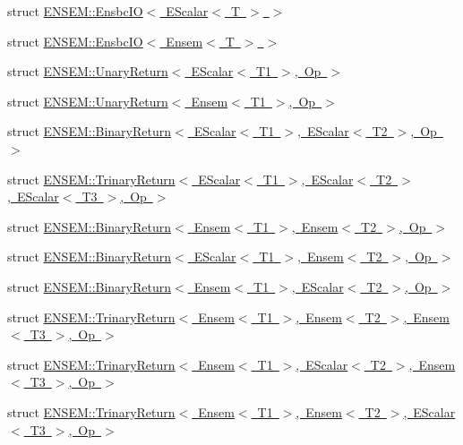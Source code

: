 \begin{DoxyCompactItemize}
struct \mbox{\hyperlink{structENSEM_1_1EnsbcIO_3_01EScalar_3_01T_01_4_01_4}{E\+N\+S\+E\+M\+::\+Ensbc\+I\+O$<$ E\+Scalar$<$ T $>$ $>$}}
\item 
struct \mbox{\hyperlink{structENSEM_1_1EnsbcIO_3_01Ensem_3_01T_01_4_01_4}{E\+N\+S\+E\+M\+::\+Ensbc\+I\+O$<$ Ensem$<$ T $>$ $>$}}
\item 
struct \mbox{\hyperlink{structENSEM_1_1UnaryReturn_3_01EScalar_3_01T1_01_4_00_01Op_01_4}{E\+N\+S\+E\+M\+::\+Unary\+Return$<$ E\+Scalar$<$ T1 $>$, Op $>$}}
\item 
struct \mbox{\hyperlink{structENSEM_1_1UnaryReturn_3_01Ensem_3_01T1_01_4_00_01Op_01_4}{E\+N\+S\+E\+M\+::\+Unary\+Return$<$ Ensem$<$ T1 $>$, Op $>$}}
\item 
struct \mbox{\hyperlink{structENSEM_1_1BinaryReturn_3_01EScalar_3_01T1_01_4_00_01EScalar_3_01T2_01_4_00_01Op_01_4}{E\+N\+S\+E\+M\+::\+Binary\+Return$<$ E\+Scalar$<$ T1 $>$, E\+Scalar$<$ T2 $>$, Op $>$}}
\item 
struct \mbox{\hyperlink{structENSEM_1_1TrinaryReturn_3_01EScalar_3_01T1_01_4_00_01EScalar_3_01T2_01_4_00_01EScalar_3_01T3_01_4_00_01Op_01_4}{E\+N\+S\+E\+M\+::\+Trinary\+Return$<$ E\+Scalar$<$ T1 $>$, E\+Scalar$<$ T2 $>$, E\+Scalar$<$ T3 $>$, Op $>$}}
\item 
struct \mbox{\hyperlink{structENSEM_1_1BinaryReturn_3_01Ensem_3_01T1_01_4_00_01Ensem_3_01T2_01_4_00_01Op_01_4}{E\+N\+S\+E\+M\+::\+Binary\+Return$<$ Ensem$<$ T1 $>$, Ensem$<$ T2 $>$, Op $>$}}
\item 
struct \mbox{\hyperlink{structENSEM_1_1BinaryReturn_3_01EScalar_3_01T1_01_4_00_01Ensem_3_01T2_01_4_00_01Op_01_4}{E\+N\+S\+E\+M\+::\+Binary\+Return$<$ E\+Scalar$<$ T1 $>$, Ensem$<$ T2 $>$, Op $>$}}
\item 
struct \mbox{\hyperlink{structENSEM_1_1BinaryReturn_3_01Ensem_3_01T1_01_4_00_01EScalar_3_01T2_01_4_00_01Op_01_4}{E\+N\+S\+E\+M\+::\+Binary\+Return$<$ Ensem$<$ T1 $>$, E\+Scalar$<$ T2 $>$, Op $>$}}
\item 
struct \mbox{\hyperlink{structENSEM_1_1TrinaryReturn_3_01Ensem_3_01T1_01_4_00_01Ensem_3_01T2_01_4_00_01Ensem_3_01T3_01_4_00_01Op_01_4}{E\+N\+S\+E\+M\+::\+Trinary\+Return$<$ Ensem$<$ T1 $>$, Ensem$<$ T2 $>$, Ensem$<$ T3 $>$, Op $>$}}
\item 
struct \mbox{\hyperlink{structENSEM_1_1TrinaryReturn_3_01Ensem_3_01T1_01_4_00_01EScalar_3_01T2_01_4_00_01Ensem_3_01T3_01_4_00_01Op_01_4}{E\+N\+S\+E\+M\+::\+Trinary\+Return$<$ Ensem$<$ T1 $>$, E\+Scalar$<$ T2 $>$, Ensem$<$ T3 $>$, Op $>$}}
\item 
struct \mbox{\hyperlink{structENSEM_1_1TrinaryReturn_3_01Ensem_3_01T1_01_4_00_01Ensem_3_01T2_01_4_00_01EScalar_3_01T3_01_4_00_01Op_01_4}{E\+N\+S\+E\+M\+::\+Trinary\+Return$<$ Ensem$<$ T1 $>$, Ensem$<$ T2 $>$, E\+Scalar$<$ T3 $>$, Op $>$}}

\end{DoxyCompactItemize}
